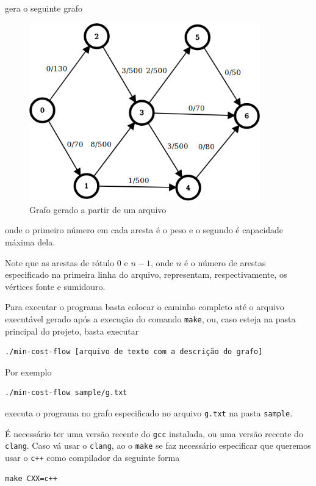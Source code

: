 \documentclass[12pt, a4]{article}
\begin{document}
\noindent gera o seguinte grafo

\begin{figure}[H]
  \centering
  \includegraphics[width=10cm]{alg-graph-example2.png}
  \caption{Grafo gerado a partir de um arquivo}
  \label{fig:alg-graph-example2}
\end{figure}

\noindent onde o primeiro número em cada aresta é o peso e o segundo é
capacidade máxima dela.

Note que as arestas de rótulo 0 e $n-1$, onde $n$ é o número de arestas
especificado na primeira linha do arquivo, representam, respectivamente, os
vértices fonte e sumidouro.

Para executar o programa basta colocar o caminho completo até o arquivo
executável gerado após a execução do comando \texttt{make}, ou, caso esteja na
pasta principal do projeto, basta executar

\begin{verbatim}
./min-cost-flow [arquivo de texto com a descrição do grafo]
\end{verbatim}

Por exemplo

\begin{verbatim}
./min-cost-flow sample/g.txt
\end{verbatim}

\noindent executa o programa no grafo especificado no arquivo \texttt{g.txt} na
pasta \texttt{sample}.

É necessário ter uma versão recente do \texttt{gcc} instalada, ou uma versão
recente do \texttt{clang}. Caso vá usar o \texttt{clang}, ao o \texttt{make} se
faz necessário especificar que queremos usar o \texttt{c++} como compilador da
seguinte forma

\begin{verbatim}
make CXX=c++
\end{verbatim}
\end{document}
